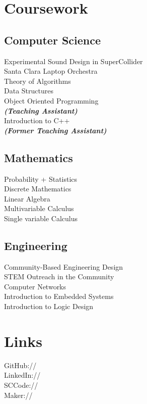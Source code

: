 \documentclass[]{deedy-resume-openfont}
\begin{document}
\begin{minipage}[t]{0.33\textwidth}

\section{Coursework}
\subsection{Computer Science}
Experimental Sound Design in SuperCollider \\
Santa Clara Laptop Orchestra \\
Theory of Algorithms \\
Data Structures \\
Object Oriented Programming \\
{\footnotesize \textit{\textbf{(Teaching Assistant)}}}\\
Introduction to C++ \\
{\footnotesize \textit{\textbf{(Former Teaching Assistant)}}}
\sectionsep

\subsection{Mathematics}
Probability + Statistics \\
Discrete Mathematics \\
Linear Algebra \\
Multivariable Calculus \\
Single variable Calculus
\sectionsep

\subsection{Engineering}
Community-Based Engineering Design\\
STEM Outreach in the Community \\
Computer Networks \\
Introduction to Embedded Systems \\
Introduction to Logic Design 
\sectionsep


\section{Links} 
GitHub://  \href{https://github.com/tanya-sonker}{} \\
LinkedIn://  \href{https://www.linkedin.com/in/tanya-sonker}{} \\
SCCode://  \href{https://sccode.org/tsonker}{} \\
Maker://  \href{https://tsonker.wixsite.com/efolio}{}

%
%

\end{minipage} 
\end{document}
